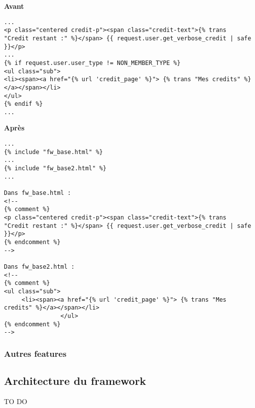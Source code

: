 \begin{minipage}{.5\textwidth}
\begin{center} \textbf{Avant}\end{center}
\begin{lstlisting}
...
<p class="centered credit-p"><span class="credit-text">{% trans "Credit restant :" %}</span> {{ request.user.get_verbose_credit | safe }}</p>
...
{% if request.user.user_type != NON_MEMBER_TYPE %}
<ul class="sub">
<li><span><a href="{% url 'credit_page' %}"> {% trans "Mes credits" %}</a></span></li>
</ul>
{% endif %}
...
\end{lstlisting} 
\end{minipage}
\hspace{0.3cm}
\begin{minipage}{.5\textwidth}
\begin{center} \textbf{Après}\end{center}
\begin{lstlisting}
...
{% include "fw_base.html" %}
...
{% include "fw_base2.html" %}
...

Dans fw_base.html : 
<!--
{% comment %}
<p class="centered credit-p"><span class="credit-text">{% trans "Credit restant :" %}</span> {{ request.user.get_verbose_credit | safe }}</p>
{% endcomment %}
-->

Dans fw_base2.html : 
<!--
{% comment %}
<ul class="sub">
     <li><span><a href="{% url 'credit_page' %}"> {% trans "Mes credits" %}</a></span></li>
                </ul>
{% endcomment %}
-->
\end{lstlisting} 
\end{minipage}

\subsubsection{Autres features}

\subsection{Architecture du framework}

TO DO


